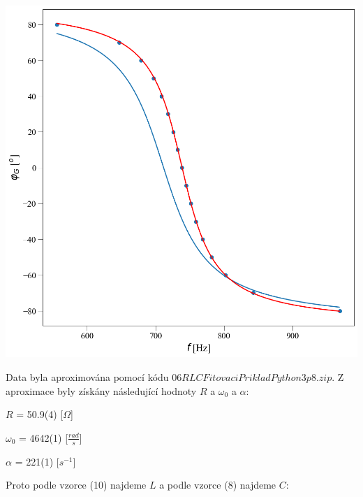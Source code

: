 \documentclass[a4paper,11pt]{article}
\begin{document}
\begin{minipage}[t]{0.5\textwidth} 
                \par \centering
                \vspace{10pt}
                \includegraphics[scale=0.3]{phi_G}
                \captionsetup{justification=centering, font=footnotesize}
                \label{fig:phi_G}
                \vspace{10pt}
                \raggedright
                Data byla aproximována pomocí kódu $06RLCFitovaciPrikladPython3p8.zip$. Z aproximace byly získány následující hodnoty $R$ a $\omega_0$ a $\alpha$: 
                \begin{center}
                    $R$ = 50.9(4) [$\Omega$]
                    \vspace{5pt}
                    \par $\omega_0$ = 4642(1) [$\frac{rad}{s}$]
                    \vspace{5pt}
                    \par $\alpha$ = 221(1) [$s^{-1}$]
                \end{center}
                Proto podle vzorce (10) najdeme $L$ a podle vzorce (8) najdeme $C$:
                \begin{center}

\end{center}
\end{minipage}
\end{document}
